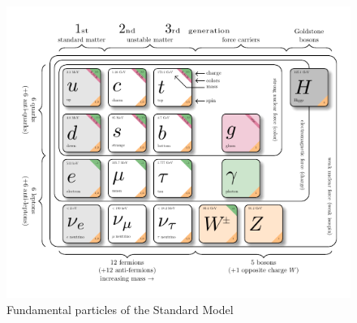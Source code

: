 \begin{figure}[h!]
    \centering
    \includegraphics[width=1\linewidth]{fig/chap02-theory/SMpart.pdf}
    \caption{Fundamental particles of the Standard Model \cite{BurgardCarstenStandardExample}}
    \label{fig:SMpart}
\end{figure}


